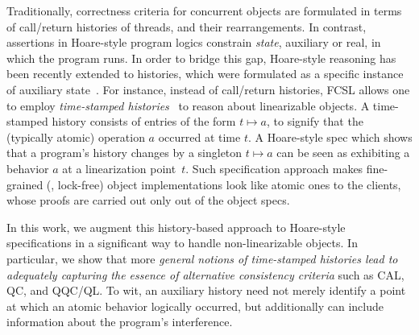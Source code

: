 Traditionally, correctness criteria for concurrent objects are
formulated in terms of call/return histories of threads, and their
rearrangements. In contrast, assertions in Hoare-style program logics
constrain \emph{state}, auxiliary or real, in which the program runs.
%
In order to bridge this gap, Hoare-style reasoning has been recently
extended to histories, which were formulated as a specific instance of
auxiliary
state~\cite{Fu-al:CONCUR10,Gotsman-al:ESOP13,Sergey-al:ESOP15,Bell-al:SAS10}.
%
%
%
%
%
For instance, instead of call/return histories, FCSL allows one to
employ \emph{time-stamped histories}~\cite{Sergey-al:ESOP15} to reason
about linearizable objects. A time-stamped history consists of entries
of the form $t \mapsto a$, to signify that the (typically atomic)
operation $a$ occurred at time $t$. A Hoare-style spec which shows
that a program's history changes by a singleton $t \mapsto a$ can be
seen as exhibiting a behavior $a$ at a linearization point~$t$.
%
Such specification approach makes fine-grained (\ie, lock-free) object
implementations look like atomic ones to the clients, whose proofs are
carried out only out of the object specs.


In this work, we augment this history-based approach to Hoare-style
specifications in a significant way to handle non-linearizable
objects. In particular, we show that more \emph{general notions of
  time-stamped histories lead to adequately capturing the essence of
  alternative consistency criteria} such as CAL, QC, and QQC/QL.  To
wit, an auxiliary history need not merely identify a point at which an
atomic behavior logically occurred, but additionally can include
information about the program's interference.

